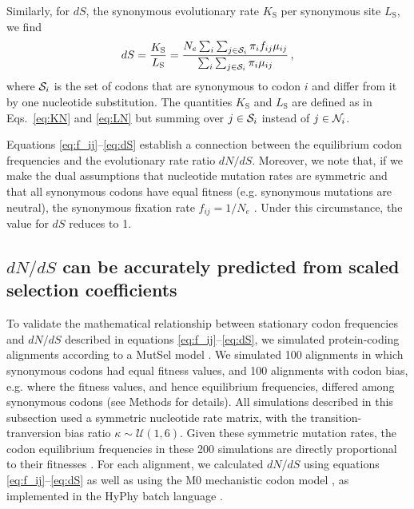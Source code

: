 \documentclass[11pt]{article}
\begin{document}
Similarly, for $dS$, the synonymous evolutionary rate $K_\text{S}$ per synonymous site $L_\text{S}$, we find
\begin{equation}\label{eq:dS}
  dS = \frac{K_\text{S}}{L_\text{S}}=\frac{ N_e \sum_i \sum_{j \in {\cal S}_i} \pi_i f_{ij} \mu_{ij} } {\sum_i \sum_{j \in {\cal S}_i} \pi_i \mu_{ij} }\,,
\end{equation}
where ${\cal S}_i$ is the set of codons that are synonymous to codon $i$ and differ from it by one nucleotide substitution. The quantities $K_\text{S}$ and $L_\text{S}$ are defined as in Eqs.~\eqref{eq:KN} and \eqref{eq:LN} but summing over $j\in {\cal S}_i$ instead of $j\in {\cal N}_i$.

Equations \eqref{eq:f_ij}--\eqref{eq:dS} establish a connection between the equilibrium codon frequencies and the evolutionary rate ratio $dN/dS$. Moreover, we note that, if we make the dual assumptions that nucleotide mutation rates are symmetric and that all synonymous codons have equal fitness (e.g. synonymous mutations are neutral), the synonymous fixation rate $f_{ij}= 1/N_e$ \cite{CrowKimura1970}. Under this circumstance, the value for $dS$ reduces to 1.

\subsection*{$dN/dS$ can be accurately predicted from scaled selection coefficients}

To validate the mathematical relationship between stationary codon frequencies and $dN/dS$ described in equations \eqref{eq:f_ij}--\eqref{eq:dS}, we simulated protein-coding alignments according to a MutSel model \cite{HalpernBruno1998,SellaHirsh2005}. We simulated 100 alignments in which synonymous codons had equal fitness values, and 100 alignments with codon bias, e.g. where the fitness values, and hence equilibrium frequencies, differed among synonymous codons (see Methods for details). All simulations described in this subsection used a symmetric nucleotide rate matrix, with the transition-tranversion bias ratio $\kappa \sim \mathcal{U}(1,6)$. Given these symmetric mutation rates, the codon equilibrium frequencies in these 200 simulations are directly proportional to their fitnesses \cite{SellaHirsh2005}. For each alignment, we calculated $dN/dS$ using equations \eqref{eq:f_ij}--\eqref{eq:dS} as well as using the M0 mechanistic codon model \cite{NielsenYang1998}, as implemented in the HyPhy batch language \cite{KosakovskyPondetal2005}.
\end{document}

